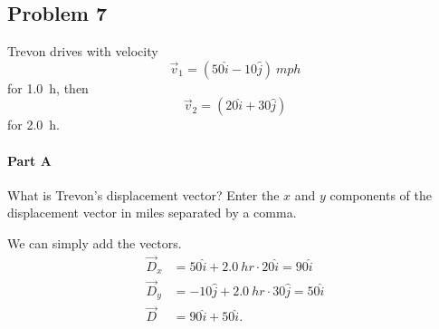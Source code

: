 
\newpage

\subsection{Problem 7}

Trevon drives with velocity
\[
	\vec{v}_1 = \left( 50 \hat{i} - 10 \hat{j} \right) \SI{}{mph}
\]
for \SI{1.0}{h}, then
\[
	\vec{v}_2 = \left( 20 \hat{i} + 30 \hat{j} \right)
\]
for \SI{2.0}{h}.

\setcounter{partcounter}{1}
\paragraph{Part A}

What is Trevon's displacement vector? Enter the $x$ and $y$ components of the displacement vector in miles separated by a comma.

\begin{solution}
	We can simply add the vectors.
	\begin{align*}
		\vec{D}_{x} &= 50 \hat{i} + \SI{2.0}{hr} \cdot 20 \hat{i} = 90 \hat{i} \\
		\vec{D}_{y} &= -10 \hat{j} + \SI{2.0}{hr} \cdot 30 \hat{j} = 50 \hat{i} \\
		\vec{D} &= 90\hat{i} + 50\hat{i}
		.\end{align*}
\end{solution}
